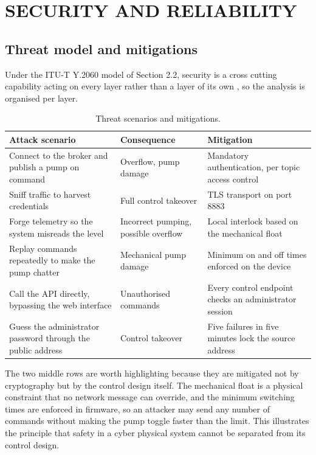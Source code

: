 \chapter{SECURITY AND RELIABILITY}

\section{Threat model and mitigations}

Under the ITU-T Y.2060 model of Section 2.2, security is a cross cutting capability acting on every layer rather than a layer of its own \cite{itu2060}, so the analysis is organised per layer.

\begin{table}[H]
\caption{Threat scenarios and mitigations.}
\label{tab:threat}
\centering
\renewcommand{\arraystretch}{1.1}
\begin{tabular}{|p{5.2cm}|p{3.4cm}|p{4.4cm}|}
\hline
\rowcolor[HTML]{B7E1F0}
\textbf{Attack scenario} & \textbf{Consequence} & \textbf{Mitigation} \\
\hline
Connect to the broker and publish a pump on command & Overflow, pump damage & Mandatory authentication, per topic access control \\
\hline
Sniff traffic to harvest credentials & Full control takeover & TLS transport on port 8883 \\
\hline
Forge telemetry so the system misreads the level & Incorrect pumping, possible overflow & Local interlock based on the mechanical float \\
\hline
Replay commands repeatedly to make the pump chatter & Mechanical pump damage & Minimum on and off times enforced on the device \\
\hline
Call the API directly, bypassing the web interface & Unauthorised commands & Every control endpoint checks an administrator session \\
\hline
Guess the administrator password through the public address & Control takeover & Five failures in five minutes lock the source address \\
\hline
\end{tabular}
\end{table}

The two middle rows are worth highlighting because they are mitigated not by cryptography but by the control design itself. The mechanical float is a physical constraint that no network message can override, and the minimum switching times are enforced in firmware, so an attacker may send any number of commands without making the pump toggle faster than the limit. This illustrates the principle that safety in a cyber physical system cannot be separated from its control design.

